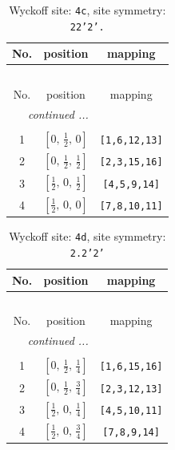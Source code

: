 \documentclass[fleqn,8pt]{jsarticle}
\begin{document}
\renewcommand{\arraystretch}{1.2}
\begin{longtable}{ccc}
\caption{Wyckoff site: {\tt 4c}, site symmetry: {\tt 22'2'.}}
 \\
 \hline \hline
No. & position & mapping \\ \hline \endfirsthead

\multicolumn{2}{l}{\tablename\ \thetable{}} \\
 \hline \hline
No. & position & mapping \\ \hline \endhead

 \hline \hline
\multicolumn{2}{r}{\footnotesize\it continued ...} \\ \endfoot

 \hline \hline
\multicolumn{2}{r}{} \\ \endlastfoot

1 & $\left[ 0,\, \frac{1}{2},\, 0 \right]$ & {\tt [1,6,12,13]} \\ \hline
2 & $\left[ 0,\, \frac{1}{2},\, \frac{1}{2} \right]$ & {\tt [2,3,15,16]} \\ \hline
3 & $\left[ \frac{1}{2},\, 0,\, \frac{1}{2} \right]$ & {\tt [4,5,9,14]} \\ \hline
4 & $\left[ \frac{1}{2},\, 0,\, 0 \right]$ & {\tt [7,8,10,11]} \\
\end{longtable}
\renewcommand{\arraystretch}{1.2}
\begin{longtable}{ccc}
\caption{Wyckoff site: {\tt 4d}, site symmetry: {\tt 2.2'2'}}
 \\
 \hline \hline
No. & position & mapping \\ \hline \endfirsthead

\multicolumn{2}{l}{\tablename\ \thetable{}} \\
 \hline \hline
No. & position & mapping \\ \hline \endhead

 \hline \hline
\multicolumn{2}{r}{\footnotesize\it continued ...} \\ \endfoot

 \hline \hline
\multicolumn{2}{r}{} \\ \endlastfoot

1 & $\left[ 0,\, \frac{1}{2},\, \frac{1}{4} \right]$ & {\tt [1,6,15,16]} \\ \hline
2 & $\left[ 0,\, \frac{1}{2},\, \frac{3}{4} \right]$ & {\tt [2,3,12,13]} \\ \hline
3 & $\left[ \frac{1}{2},\, 0,\, \frac{1}{4} \right]$ & {\tt [4,5,10,11]} \\ \hline
4 & $\left[ \frac{1}{2},\, 0,\, \frac{3}{4} \right]$ & {\tt [7,8,9,14]} \\
\end{longtable}
\end{document}
